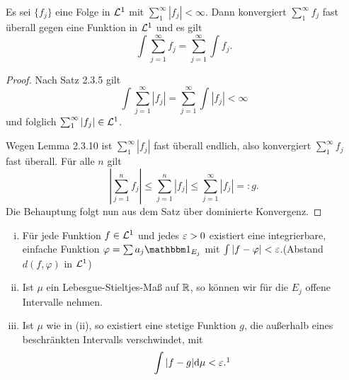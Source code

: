 \documentclass[
 a4paper,
 12pt,
 parskip=half
 ]{scrreprt}
\theoremstyle{plain}
\theoremstyle{definition}
\numberwithin{equation}{section}
\begin{document}

\begin{thm}
 Es sei $\{ f_j \}$ eine Folge in $\mathcal{L}^1$ mit $\sum_1^\infty |f_j| < \infty$. Dann konvergiert $\sum_1^\infty f_j$ fast überall gegen eine Funktion in $\mathcal{L}^1$ und es gilt
 \[ \int \sum_{j=1}^\infty f_j = \sum_{j=1}^\infty \int f_j. \]
\end{thm}

\begin{proof}
 Nach Satz 2.3.5 gilt
 \[ \int \sum_{j=1}^\infty | f_j | = \sum_{j=1}^\infty \int |f_j| < \infty \]
 und folglich $\sum_1^\infty | f_j | \in \mathcal{L}^1$.
 
 Wegen Lemma 2.3.10 ist $\sum_1^\infty |f_j|$ fast überall endlich, also konvergiert $\sum_1^\infty f_j$ fast überall.  Für alle $n$ gilt
 \[ \left| \sum_{j=1}^n f_j \right| \le \sum_{j=1}^n | f_j | \le \sum_{j=1}^\infty |f_j| =: g. \]
 Die Behauptung folgt nun aus dem Satz über dominierte Konvergenz.
\end{proof}

\begin{thm}
 \begin{enumerate}[(i)]
  \item Für jede Funktion $f \in \mathcal{L}^1$ und jedes $\varepsilon > 0$ existiert eine integrierbare, einfache Funktion $\varphi = \sum a_j \ind_{E_j}$ mit $\int | f -\varphi | < \varepsilon$.\footnotemark (Abstand $d(f,\varphi)$ in $\mathcal{L}^1$)
  \item Ist $\mu$ ein Lebesgue-Stieltjes-Maß auf $\mathbb{R}$, so können wir für die $E_j$ offene Intervalle nehmen.
  \item Ist $\mu$ wie in (ii), so existiert eine stetige Funktion $g$, die außerhalb eines beschränkten Intervalls verschwindet\footnotemark, mit
  \[ \int |f-g| \diffop \mu < \eps.\footnotemark \]
 \end{enumerate}

\end{thm}
\addtocounter{footnote}{-3} %
\end{document}
